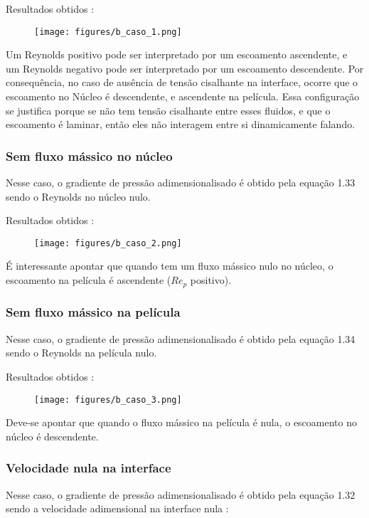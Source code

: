 \documentclass[a4paper, 11pt]{article}
\begin{document}
Resultados obtidos :
\begin{figure}[H]
  \texttt{[image: figures/b\_caso\_1.png]}  
\end{figure}

Um Reynolds positivo pode ser interpretado por um escoamento ascendente, e um Reynolds negativo pode ser interpretado por um escoamento descendente.
Por consequência, no caso de ausência de tensão cisalhante na interface, ocorre que o escoamento no Núcleo é descendente, e ascendente na película.
Essa configuração se justifica porque se não tem tensão cisalhante entre esses fluidos, e que o escoamento é laminar, então eles não interagem entre si dinamicamente falando.

\subsubsection{Sem fluxo mássico no núcleo}
Nesse caso, o gradiente de pressão adimensionalisado é obtido pela equação 1.33 sendo o Reynolds no núcleo nulo.

Resultados obtidos :
\begin{figure}[H]
  \texttt{[image: figures/b\_caso\_2.png]}  
\end{figure}

É interessante apontar que quando tem um fluxo mássico nulo no núcleo, o escoamento na película é ascendente ($Re_p$ positivo).

\subsubsection{Sem fluxo mássico na película}
Nesse caso, o gradiente de pressão adimensionalisado é obtido pela equação 1.34 sendo o Reynolds na película nulo.

Resultados obtidos :
\begin{figure}[H]
  \texttt{[image: figures/b\_caso\_3.png]}  
\end{figure}

Deve-se apontar que quando o fluxo mássico na película é nula, o escoamento no núcleo é descendente.

\subsubsection{Velocidade nula na interface}
Nesse caso, o gradiente de pressão adimensionalisado é obtido pela equação 1.32 sendo a velocidade adimensional na interface nula :
\end{document}
